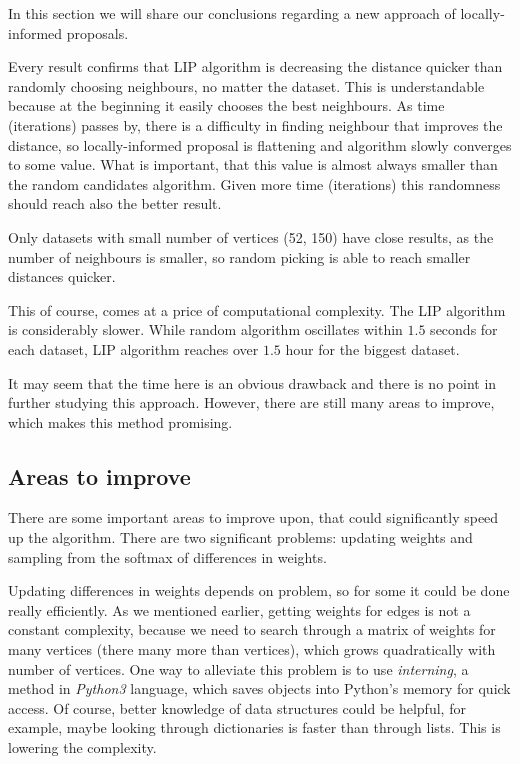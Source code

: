 In this section we will share our conclusions regarding a new approach of locally-informed proposals.

Every result confirms that LIP algorithm is decreasing the distance quicker than randomly choosing neighbours, no matter the dataset. This is understandable because at the beginning it easily chooses the best neighbours. As time (iterations) passes by, there is a difficulty in finding neighbour that improves the distance, so locally-informed proposal is flattening and algorithm slowly converges to some value. What is important, that this value is almost always smaller than the random candidates algorithm. Given more time (iterations) this randomness should reach also the better result.

Only datasets with small number of vertices (52, 150) have close results, as the number of neighbours is smaller, so random picking is able to reach smaller distances quicker.

This of course, comes at a price of computational complexity. The LIP algorithm is considerably slower. While random algorithm oscillates within $1.5$ seconds for each dataset, LIP algorithm reaches over $1.5$ hour for the biggest dataset.

It may seem that the time here is an obvious drawback and there is no point in further studying this approach. However, there are still many areas to improve, which makes this method promising.

\subsection{Areas to improve}
	There are some important areas to improve upon, that could significantly speed up the algorithm. There are two significant problems: updating weights and sampling from the softmax of differences in weights. 
	
	Updating differences in weights depends on problem, so for some it could be done really efficiently. As we mentioned earlier, getting weights for edges is not a constant complexity, because we need to search through a matrix of weights for many vertices (there many more than vertices), which grows quadratically with number of vertices. One way to alleviate this problem is to use \textit{interning}, a method in \textit{Python3} language, which saves objects into Python's memory for quick access. Of course, better knowledge of data structures could be helpful, for example, maybe looking through dictionaries is faster than through lists. This is lowering the complexity.
	
